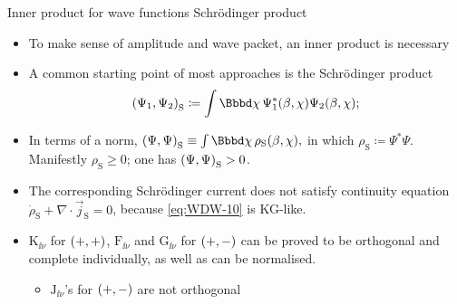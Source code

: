 \documentclass[9pt]{beamer}
\begin{document}
\begin{frame}%
{Inner product for wave functions}%
{Schrödinger product}
\begin{itemize}
\item To make sense of amplitude and wave packet, an inner product is necessary

\item A common starting point of most approaches is the \alert{Schrödinger 
product}
\begin{align}
\rbr{\Psi_1,\Psi_2}_\text{S} \coloneqq
\int \dd \chi\,\rfun{\Psi_1^*}{\beta,\chi} \rfun{\Psi_2}{\beta,\chi};
\end{align}

\item In terms of a norm, $\rbr{\Psi, \Psi}_\text{S} \equiv \int \dd \chi\,
\rfun{\rho_\text{S}}{\beta,\chi},$ in which $\rho_\text{S} \coloneqq 
\Psi^*\Psi$. Manifestly $\rho_\text{S} \ge 0$; one has ${\left(\Psi, 
\Psi\right)}_\text{S} > 0$.

\item
The corresponding Schrödinger current does not satisfy continuity equation
$\dot{\rho}_\text{S} + \nabla\cdot \vec{j}_\text{S} = 0$, because 
\cref{eq:WDW-10} is KG-like.
\item $\mathrm{K}_{\ii\nu}$%
 for ${\left(+,+\right)}$, 
$\mathrm{F}_{\ii\nu}$ and $\mathrm{G}_{\ii\nu}$ for ${\left(+,-\right)}$ can be proved to 
be orthogonal and complete individually, as well as can be normalised.
\begin{itemize}
\item $\mathrm{J}_{\ii\nu}$'s for ${\left(+,-\right)}$ are not orthogonal
\end{itemize}

\end{itemize}
\end{frame}
\end{document}
